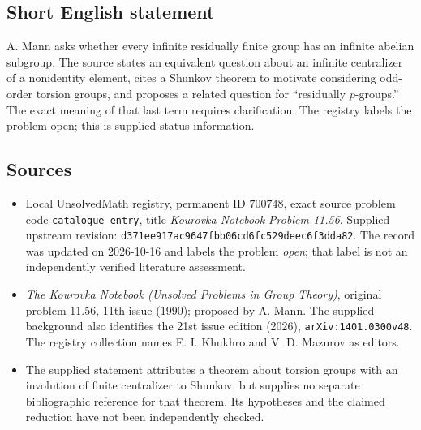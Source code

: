 \documentclass[11pt]{article}
\begin{document}
\subsection{Short English statement}
A. Mann asks whether every infinite residually finite group has an infinite abelian subgroup. The source states an equivalent question about an infinite centralizer of a nonidentity element, cites a Shunkov theorem to motivate considering odd-order torsion groups, and proposes a related question for ``residually $p$-groups.'' The exact meaning of that last term requires clarification. The registry labels the problem open; this is supplied status information.
\subsection{Sources}
\begin{itemize}
\item Local UnsolvedMath registry, permanent ID $700748$, exact source problem code \texttt{catalogue entry}, title \emph{Kourovka Notebook Problem 11.56}. Supplied upstream revision: \texttt{d371ee917ac9647fbb06cd6fc529deec6f3dda82}. The record was updated on 2026-10-16 and labels the problem \emph{open}; that label is not an independently verified literature assessment.
\item \emph{The Kourovka Notebook (Unsolved Problems in Group Theory)}, original problem 11.56, 11th issue (1990); proposed by A. Mann. The supplied background also identifies the 21st issue edition (2026), \texttt{arXiv:1401.0300v48}. The registry collection names E. I. Khukhro and V. D. Mazurov as editors.
\item The supplied statement attributes a theorem about torsion groups with an involution of finite centralizer to Shunkov, but supplies no separate bibliographic reference for that theorem. Its hypotheses and the claimed reduction have not been independently checked.
\end{itemize}
\end{document}
